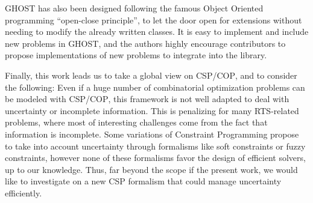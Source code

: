 \documentclass[journal]{IEEEtran}
\newcommand{\csp}{\textsc{CSP}\xspace}
\newcommand{\cop}{\textsc{COP}\xspace}
\newcommand{\ghost}{\textsc{GHOST}\xspace}
\begin{document}
\ghost has  also been  designed following  the famous  Object Oriented
programming  ``open-close  principle'',  to  let  the  door  open  for
extensions without needing  to modify the already  written classes. It
is  easy to  implement and  include new  problems in  \ghost, and  the
authors highly  encourage contributors  to propose  implementations of
new problems to integrate into the library.

Finally, this work leads us to take a global view on \csp/\cop, and to
consider the  following: Even  if a huge  number of  combinatorial optimization problems can be modeled with \csp/\cop, this framework is
not   well   adapted   to   deal  with   uncertainty   or   incomplete
information. This  is penalizing for many  RTS-related problems, where
most of interesting challenges come  from the fact that information is
incomplete. Some variations of  Constraint Programming propose to take
into account  uncertainty through formalisms like  soft constraints or
fuzzy constraints, however  none of these formalisms  favor the design
of efficient solvers, up to our  knowledge. Thus, far beyond the scope
if  the present  work, we  would  like to  investigate on  a new  \csp
formalism that could manage uncertainty efficiently.




\ifCLASSOPTIONcaptionsoff
  \newpage
\fi

                                                    



\end{document}

